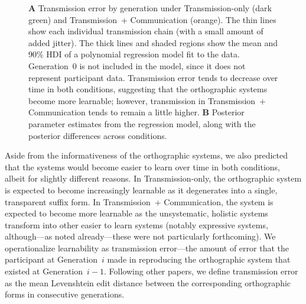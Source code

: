 \documentclass[doc,biblatex]{apa7}
\begin{document}
	\begin{figure}
	\vspace*{2pt}
	\caption{\textbf{A} Transmission error by generation under Transmission-only (dark green) and Transmission~+ Communication (orange). The thin lines show each individual transmission chain (with a small amount of added jitter). The thick lines and shaded regions show the mean and 90\% HDI of a polynomial regression model fit to the data. Generation~0 is not included in the model, since it does not represent participant data. Transmission error tends to decrease over time in both conditions, suggesting that the orthographic systems become more learnable; however, transmission in Transmission~+ Communication tends to remain a little higher. \textbf{B} Posterior parameter estimates from the regression model, along with the posterior differences across conditions.}
	\label{te_dif}
	\end{figure}

Aside from the informativeness of the orthographic systems, we also predicted that the systems would become easier to learn over time in both conditions, albeit for slightly different reasons. In Transmission-only, the orthographic system is expected to become increasingly learnable as it degenerates into a single, transparent suffix form. In Transmission~+ Communication, the system is expected to become more learnable as the unsystematic, holistic systems transform into other easier to learn systems (notably expressive systems, although---as noted already---these were not particularly forthcoming). We operationalize learnability as transmission error---the amount of error that the participant at Generation~$i$ made in reproducing the orthographic system that existed at Generation~$i-1$. Following other papers, we define transmission error as the mean Levenshtein edit distance between the corresponding orthographic forms in consecutive generations.
\end{document}
